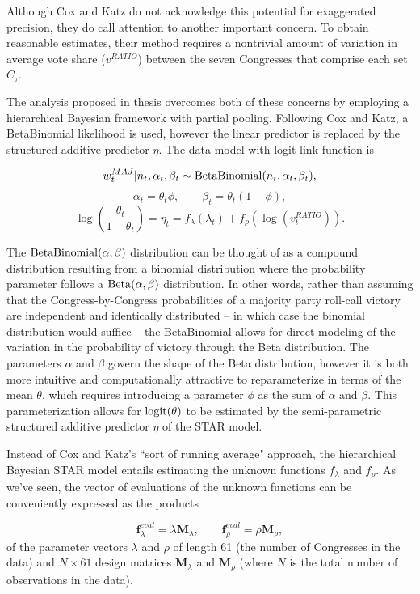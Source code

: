 Although Cox and Katz do not acknowledge this potential for exaggerated precision, they do call attention to another important concern. To obtain reasonable estimates, their method requires a nontrivial amount of variation in average vote share ($v^{RATIO}$) between the seven Congresses that comprise each set $C_\tau$. 

The analysis proposed in thesis overcomes both of these concerns by employing a hierarchical Bayesian framework with partial pooling. Following Cox and Katz, a BetaBinomial likelihood is used, however the linear predictor is replaced by the structured additive predictor $\eta$. The data model with logit link function is 

$$w_t^{MAJ} | n_t, \alpha_t, \beta_t \sim {\rm BetaBinomial}(n_t, \alpha_t, \beta_t),$$
$$ \alpha_t = \theta_t \phi, \qquad \beta_t = \theta_t (1 - \phi),$$
$$ \log\left({\frac{\theta_t}{1 - \theta_t}}\right) = \eta_t = f_{\lambda}(\lambda_t) + f_\rho \left(\log{(v_t^{RATIO})}\right).$$

The ${\rm BetaBinomial}(\alpha,\beta)$ distribution can be thought of as a compound distribution resulting from a binomial distribution where the probability parameter follows a ${\rm Beta}(\alpha,\beta)$ distribution. In other words, rather than assuming that the Congress-by-Congress probabilities of a majority party roll-call victory are independent and identically distributed -- in which case the binomial distribution would suffice -- the BetaBinomial  allows for direct modeling of the variation in the probability of victory through the Beta distribution. The parameters $\alpha$ and $\beta$ govern the shape of the Beta distribution, however it is both more intuitive and computationally attractive to reparameterize in terms of the mean $\theta$, which requires introducing a parameter $\phi$ as the sum of $\alpha$ and $\beta$.  This parameterization allows for ${\rm logit}(\theta)$ to be estimated by the semi-parametric structured additive predictor $\eta$ of the STAR model. 

Instead of Cox and Katz's ``sort of running average" approach, the hierarchical Bayesian STAR model entails estimating the unknown functions $f_\lambda$ and $f_\rho$. As we've seen, the vector of evaluations of the unknown functions can be conveniently expressed as the products 

{\singlespacing
$$
\mathbf{f}^{eval}_\lambda = \lambda \mathbf{M}_\lambda, 
\qquad 
\mathbf{f}^{eval}_\rho = \rho \mathbf{M}_\rho, 
$$
}
%
\noindent of the parameter vectors $\lambda$ and $\rho$ of length 61 (the number of Congresses in the data) and  $N \times 61$ design matrices  $\mathbf{M}_\lambda$ and  $\mathbf{M}_\rho$ (where $N$ is the total number of observations in the data).   

